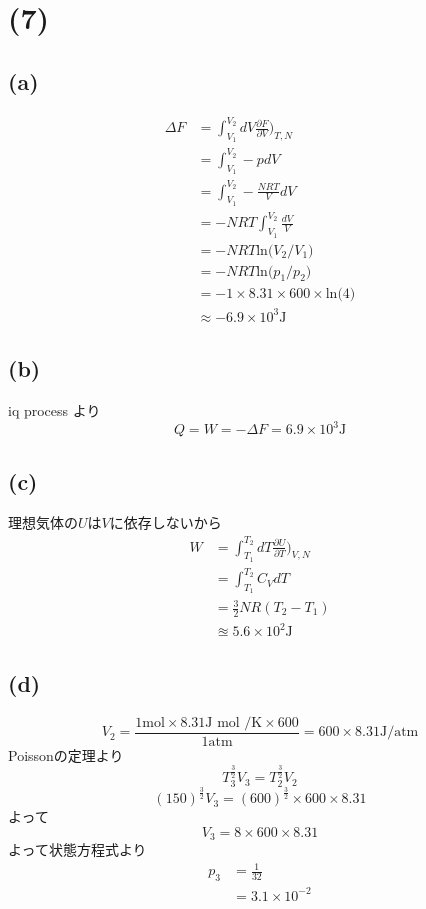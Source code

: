 \section*{(7)}
\subsection*{(a)}
\begin{align*}
  \Delta F
  &= \int^{V_2}_{V_1} dV \frac{\partial F}{\partial V} \bigg)_{T,N}\\
  &=\int^{V_2}_{V_1}  -p dV\\
  &=\int^{V_2}_{V_1}  -\frac{NRT}{V} dV\\
  &=- NRT \int^{V_2}_{V_1} \frac{dV}{V}\\
  &=- NRT \text{ln} \big(V_2/V_1\big)\\
  &=- NRT \text{ln} \big(p_1/p_2\big)\\
  &=- 1 \times 8.31 \times 600 \times   \text{ln} \big(4\big)\\
  &\approx -6.9 \times 10^3 \text{J}
\end{align*}

\subsection*{(b)}
iq process より
\[Q = W =- \Delta F = 6.9 \times 10^3 \text{J}\]


\subsection*{(c)}
理想気体の$U$は$V$に依存しないから
\begin{align*}
  W
  &=\int^{T_2}_{T_1} dT \frac{\partial U}{\partial T}\bigg)_{V,N}\\
  &=\int^{T_2}_{T_1} C_V dT\\
  &=\frac{3}{2} NR(T_2-T_1)\\
  &\approxeq 5.6 \times 10^2 \text{J}
\end{align*}

\subsection*{(d)}
\[V_2 = \frac{1 \text{mol} \times 8.31 \text{J mol /K} \times 600 }{1 \text{atm}} = 600 \times 8.31 \text{J/atm}\]
Poissonの定理より
\[T_3^{\frac{3}{2}}V_3 = T_2^{\frac{3}{2}}V_2\]
\[(150)^{\frac{3}{2}}V_3 = (600)^{\frac{3}{2}} \times 600 \times 8.31\]
よって
\[V_3 = 8 \times 600 \times 8.31\]
よって状態方程式より
\begin{align*}
  p_3 
  &= \frac{1}{32}\\
  & = 3.1 \times 10^{-2}
\end{align*}
